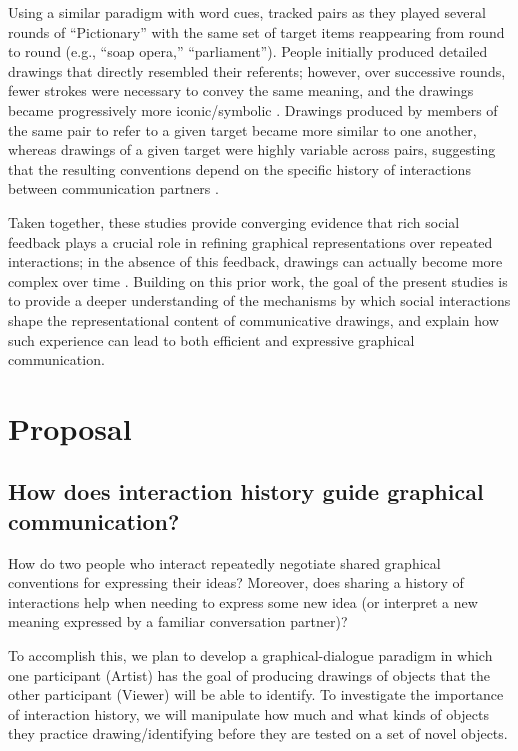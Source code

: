 \documentclass[12pt]{article}
\begin{document}
Using a similar paradigm with word cues, \cite{Fay:2010jh} tracked pairs as they played several rounds of “Pictionary” with the same set of target items reappearing from round to round (e.g., “soap opera,” “parliament”). People initially produced detailed drawings that directly resembled their referents; however, over successive rounds, fewer strokes were necessary to convey the same meaning, and the drawings became progressively more iconic/symbolic \cite{Garrod:2007wk}. Drawings produced by members of the same pair to refer to a given target became more similar to one another, whereas drawings of a given target were highly variable across pairs, suggesting that the resulting conventions depend on the specific history of interactions between communication partners \cite{Fay:2010jh}.

Taken together, these studies provide converging evidence that rich social feedback plays a crucial role in refining graphical representations over repeated interactions; in the absence of this feedback, drawings can actually become more complex over time \cite{Garrod:2007wk,Hupet:1992ua}. Building on this prior work, the goal of the present studies is to provide a deeper understanding of the mechanisms by which social interactions shape the representational content of communicative drawings, and explain how such experience can lead to both efficient and expressive graphical communication. 

\section{Proposal}

\subsection{How does interaction history guide graphical communication?}

How do two people who interact repeatedly negotiate shared graphical conventions for expressing their ideas? Moreover, does sharing a history of interactions help when needing to express some new idea (or interpret a new meaning expressed by a familiar conversation partner)? 

To accomplish this, we plan to develop a graphical-dialogue paradigm in which one participant (Artist) has the goal of producing drawings of objects that the other participant (Viewer) will be able to identify. To investigate the importance of interaction history, we will manipulate how much and what kinds of objects they practice drawing/identifying before they are tested on a set of novel objects.
\end{document}
